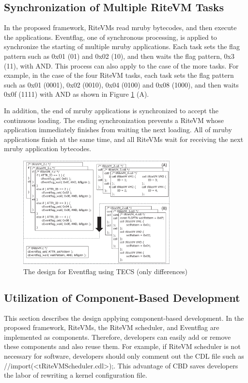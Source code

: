 \documentclass{sig-alternate-05-2015}
\begin{document}
\subsection{Synchronization of Multiple RiteVM Tasks}
In the proposed framework, RiteVMs read mruby bytecodes, and then execute the applications.
Eventflag, one of synchronous processing, is applied to synchronize the starting of multiple mruby applications.
Each task sets the flag pattern such as 0x01 (01) and 0x02 (10), and then waits the flag pattern, 0x3 (11), with AND.
This process can also apply to the case of the more tasks.
For example, in the case of the four RiteVM tasks, each task sets the flag pattern such as 0x01 (0001), 0x02 (0010), 0x04 (0100)  and 0x08 (1000), and then waits 0x0f (1111) with AND as shown in Figure \ref{fig:Eventflag} (A).

In addition, the end of mruby applications is synchronized to accept the continuous loading.
The ending synchronization prevents a RiteVM whose application immediately finishes from waiting the next loading.
All of mruby applications finish at the same time, and all RiteVMs wait for receiving the next mruby application bytecodes. 

\begin{figure}[t]
    \centering
    \includegraphics[width=8cm,clip]{figure/Eventflag.eps}
    \vspace{1mm}
\caption{The design for Eventflag using TECS (only differences)}
    \vspace{1mm}
\label{fig:Eventflag}
\end{figure}
 
\subsection{Utilization of Component-Based Development}
This section describes the design applying component-based development.
In the proposed framework, RiteVMs, the RiteVM scheduler, and Eventflag are implemented as components.
Therefore, developers can easily add or remove these components and also reuse them.
For example, if RiteVM scheduler is not necessary for software, developers should only comment out the CDL file such as {\myit //import(<tRiteVMScheduler.cdl>);}.
This advantage of CBD saves developers the labor of rewriting a kernel configuration file.
\end{document}
